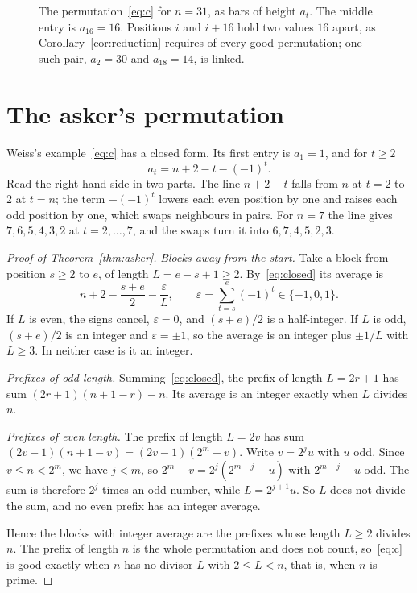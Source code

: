 \documentclass[11pt]{amsart}
\theoremstyle{remark}
\begin{document}
\begin{figure}[ht]
\centering
\begin{tikzpicture}
  
\end{tikzpicture}
\caption{The permutation~\eqref{eq:c} for $n=31$, as bars of height $a_t$. The middle entry is $a_{16}=16$. Positions $i$ and $i+16$ hold two values $16$ apart, as Corollary~\ref{cor:reduction} requires of every good permutation; one such pair, $a_2=30$ and $a_{18}=14$, is linked.}
\label{fig:pairs}
\end{figure}

\section{The asker's permutation}

Weiss's example~\eqref{eq:c} has a closed form. Its first entry is $a_1=1$, and for $t\ge2$
\begin{equation}\label{eq:closed}
a_t=n+2-t-(-1)^t .
\end{equation}
Read the right-hand side in two parts. The line $n+2-t$ falls from $n$ at $t=2$ to $2$ at $t=n$; the term $-(-1)^t$ lowers each even position by one and raises each odd position by one, which swaps neighbours in pairs. For $n=7$ the line gives $7,6,5,4,3,2$ at $t=2,\dots,7$, and the swaps turn it into $6,7,4,5,2,3$.

\begin{proof}[Proof of Theorem~\ref{thm:asker}]
\emph{Blocks away from the start.} Take a block from position $s\ge2$ to $e$, of length $L=e-s+1\ge2$. By~\eqref{eq:closed} its average is
\[
n+2-\frac{s+e}2-\frac{\varepsilon}{L},\qquad \varepsilon=\sum_{t=s}^{e}(-1)^t\in\{-1,0,1\}.
\]
If $L$ is even, the signs cancel, $\varepsilon=0$, and $(s+e)/2$ is a half-integer. If $L$ is odd, $(s+e)/2$ is an integer and $\varepsilon=\pm1$, so the average is an integer plus $\pm1/L$ with $L\ge3$. In neither case is it an integer.

\emph{Prefixes of odd length.} Summing~\eqref{eq:closed}, the prefix of length $L=2r+1$ has sum $(2r+1)(n+1-r)-n$. Its average is an integer exactly when $L$ divides $n$.

\emph{Prefixes of even length.} The prefix of length $L=2v$ has sum $(2v-1)(n+1-v)=(2v-1)(2^m-v)$. Write $v=2^ju$ with $u$ odd. Since $v\le n<2^m$, we have $j<m$, so $2^m-v=2^j(2^{m-j}-u)$ with $2^{m-j}-u$ odd. The sum is therefore $2^j$ times an odd number, while $L=2^{j+1}u$. So $L$ does not divide the sum, and no even prefix has an integer average.

Hence the blocks with integer average are the prefixes whose length $L\ge2$ divides $n$. The prefix of length $n$ is the whole permutation and does not count, so~\eqref{eq:c} is good exactly when $n$ has no divisor $L$ with $2\le L<n$, that is, when $n$ is prime.
\end{proof}
\end{document}

